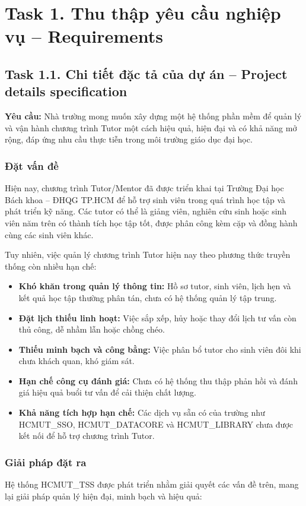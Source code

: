 \section{Task 1. Thu thập yêu cầu nghiệp vụ -- Requirements}
\subsection{Task 1.1. Chi tiết đặc tả của dự án -- Project details specification}

\textbf{Yêu cầu: } Nhà trường mong muốn xây dựng một hệ thống phần mềm để quản lý và vận hành chương trình Tutor một cách hiệu quả, hiện đại và có khả năng mở rộng, đáp ứng nhu cầu thực tiễn trong môi trường giáo dục đại học.

\subsubsection{Đặt vấn đề}
Hiện nay, chương trình Tutor/Mentor đã được triển khai tại Trường Đại học Bách khoa – ĐHQG TP.HCM để hỗ trợ sinh viên trong quá trình học tập và phát triển kỹ năng. Các tutor có thể là giảng viên, nghiên cứu sinh hoặc sinh viên năm trên có thành tích học tập tốt, được phân công kèm cặp và đồng hành cùng các sinh viên khác.

Tuy nhiên, việc quản lý chương trình Tutor hiện nay theo phương thức truyền thống còn nhiều hạn chế:
\begin{itemize}
	\item \textbf{Khó khăn trong quản lý thông tin:} Hồ sơ tutor, sinh viên, lịch hẹn và kết quả học tập thường phân tán, chưa có hệ thống quản lý tập trung.
	\item \textbf{Đặt lịch thiếu linh hoạt:} Việc sắp xếp, hủy hoặc thay đổi lịch tư vấn còn thủ công, dễ nhầm lẫn hoặc chồng chéo.
	\item \textbf{Thiếu minh bạch và công bằng:} Việc phân bổ tutor cho sinh viên đôi khi chưa khách quan, khó giám sát.
	\item \textbf{Hạn chế công cụ đánh giá:} Chưa có hệ thống thu thập phản hồi và đánh giá hiệu quả buổi tư vấn để cải thiện chất lượng.
	\item \textbf{Khả năng tích hợp hạn chế:} Các dịch vụ sẵn có của trường như HCMUT\_SSO, HCMUT\_DATACORE và HCMUT\_LIBRARY chưa được kết nối để hỗ trợ chương trình Tutor.
\end{itemize}


\subsubsection{Giải pháp đặt ra}
Hệ thống HCMUT\_TSS được phát triển nhằm giải quyết các vấn đề trên, mang lại giải pháp quản lý hiện đại, minh bạch và hiệu quả:

